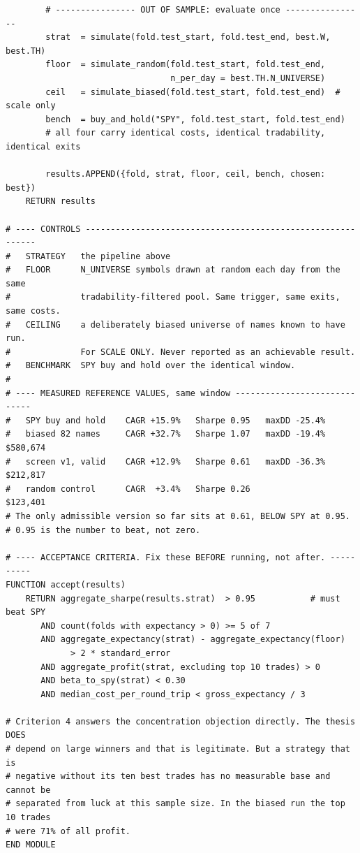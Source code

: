 \documentclass[10pt]{article}
\begin{document}
\begin{lstlisting}
        # ---------------- OUT OF SAMPLE: evaluate once ----------------
        strat  = simulate(fold.test_start, fold.test_end, best.W, best.TH)
        floor  = simulate_random(fold.test_start, fold.test_end,
                                 n_per_day = best.TH.N_UNIVERSE)
        ceil   = simulate_biased(fold.test_start, fold.test_end)  # scale only
        bench  = buy_and_hold("SPY", fold.test_start, fold.test_end)
        # all four carry identical costs, identical tradability, identical exits

        results.APPEND({fold, strat, floor, ceil, bench, chosen: best})
    RETURN results

# ---- CONTROLS ------------------------------------------------------------
#   STRATEGY   the pipeline above
#   FLOOR      N_UNIVERSE symbols drawn at random each day from the same
#              tradability-filtered pool. Same trigger, same exits, same costs.
#   CEILING    a deliberately biased universe of names known to have run.
#              For SCALE ONLY. Never reported as an achievable result.
#   BENCHMARK  SPY buy and hold over the identical window.
#
# ---- MEASURED REFERENCE VALUES, same window -----------------------------
#   SPY buy and hold    CAGR +15.9%   Sharpe 0.95   maxDD -25.4%
#   biased 82 names     CAGR +32.7%   Sharpe 1.07   maxDD -19.4%   $580,674
#   screen v1, valid    CAGR +12.9%   Sharpe 0.61   maxDD -36.3%   $212,817
#   random control      CAGR  +3.4%   Sharpe 0.26                  $123,401
# The only admissible version so far sits at 0.61, BELOW SPY at 0.95.
# 0.95 is the number to beat, not zero.

# ---- ACCEPTANCE CRITERIA. Fix these BEFORE running, not after. ----------
FUNCTION accept(results)
    RETURN aggregate_sharpe(results.strat)  > 0.95           # must beat SPY
       AND count(folds with expectancy > 0) >= 5 of 7
       AND aggregate_expectancy(strat) - aggregate_expectancy(floor)
             > 2 * standard_error
       AND aggregate_profit(strat, excluding top 10 trades) > 0
       AND beta_to_spy(strat) < 0.30
       AND median_cost_per_round_trip < gross_expectancy / 3

# Criterion 4 answers the concentration objection directly. The thesis DOES
# depend on large winners and that is legitimate. But a strategy that is
# negative without its ten best trades has no measurable base and cannot be
# separated from luck at this sample size. In the biased run the top 10 trades
# were 71% of all profit.
END MODULE
\end{lstlisting}
\end{document}
